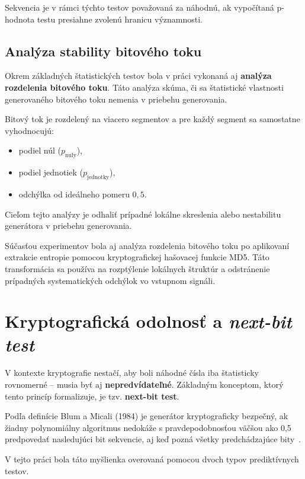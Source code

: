 Sekvencia je v rámci týchto testov považovaná za náhodnú, ak vypočítaná p-hodnota testu presiahne zvolenú hranicu významnosti.

\subsection{Analýza stability bitového toku}

Okrem základných štatistických testov bola v práci vykonaná aj \textbf{analýza rozdelenia bitového toku}.
Táto analýza skúma, či sa štatistické vlastnosti generovaného bitového toku nemenia v priebehu generovania.

Bitový tok je rozdelený na viacero segmentov a pre každý segment sa samostatne vyhodnocujú:
\begin{itemize}
  \item podiel núl ($p_{\text{nuly}}$),
  \item podiel jednotiek ($p_{\text{jednotky}}$),
  \item odchýlka od ideálneho pomeru $0{,}5$.
\end{itemize}

Cieľom tejto analýzy je odhaliť prípadné lokálne skreslenia alebo nestabilitu generátora v priebehu generovania.

Súčasťou experimentov bola aj analýza rozdelenia bitového toku po aplikovaní extrakcie entropie pomocou kryptografickej hašovacej funkcie MD5.
Táto transformácia sa používa na rozptýlenie lokálnych štruktúr a odstránenie prípadných systematických odchýlok vo vstupnom signáli.

\section{Kryptografická odolnosť a \textit{next-bit test}}\label{sec:kryptograficka-bezpecnost-a-textit{next-bit-test}}

V kontexte kryptografie nestačí, aby boli náhodné čísla iba štatisticky rovnomerné – musia byť aj \textbf{nepredvídateľné}.
Základným konceptom, ktorý tento princíp formalizuje, je tzv. \textbf{next-bit test}.

Podľa definície Blum a Micali (1984) je generátor kryptograficky bezpečný, ak žiadny polynomiálny algoritmus nedokáže s pravdepodobnosťou väčšou ako 0,5 predpovedať nasledujúci bit sekvencie, aj keď pozná všetky predchádzajúce bity~\cite{BlumMicali1984}.

V tejto práci bola táto myšlienka overovaná pomocou dvoch typov prediktívnych testov.


